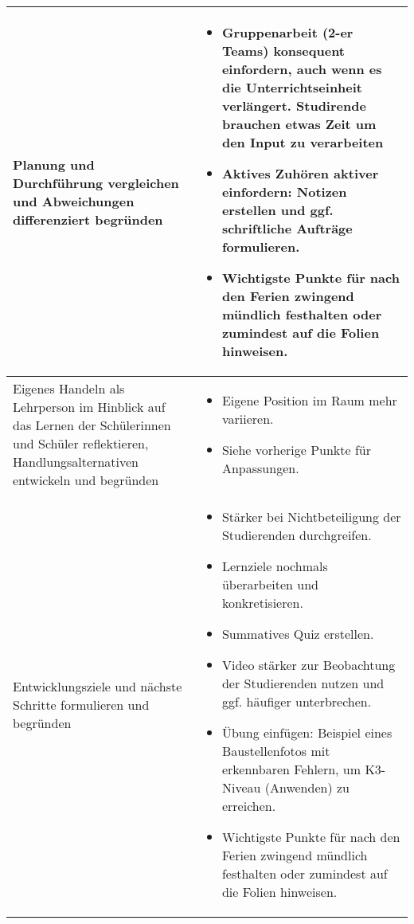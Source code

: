 \documentclass[
11pt,
captions=tableheading,
headsepline,
footsepline, 
captions=tableheading,
parskip=half-,
]{scrartcl}
\begin{document}
\begin{landscape}
\begin{longtable}{@{}p{8cm}|p{15cm}@{}}
        Planung und Durchführung vergleichen und Abweichungen differenziert begründen &
        \begin{itemize}
            \item Gruppenarbeit (2-er Teams) konsequent einfordern, auch wenn es die Unterrichtseinheit verlängert. Studirende brauchen etwas Zeit um den Input zu verarbeiten
            \item Aktives Zuhören aktiver einfordern: Notizen erstellen und ggf. schriftliche Aufträge formulieren.
            \item  Wichtigste Punkte für nach den Ferien zwingend mündlich festhalten oder zumindest auf die Folien hinweisen.
        \end{itemize} \\
        \midrule
    
        Eigenes Handeln als Lehrperson im Hinblick auf das Lernen der Schülerinnen und Schüler reflektieren, Handlungsalternativen entwickeln und begründen &
        \begin{itemize}
            \item Eigene Position im Raum mehr variieren.
            \item Siehe vorherige Punkte für Anpassungen.
        \end{itemize} \\
        \midrule
    
        Entwicklungsziele und nächste Schritte formulieren und begründen &
        \begin{itemize}
            \item Stärker bei Nichtbeteiligung der Studierenden durchgreifen.
            \item Lernziele nochmals überarbeiten und konkretisieren.
            \item Summatives Quiz erstellen.
            \item Video stärker zur Beobachtung der Studierenden nutzen und ggf. häufiger unterbrechen.
            \item Übung einfügen: Beispiel eines Baustellenfotos mit erkennbaren Fehlern, um K3-Niveau (Anwenden) zu erreichen.
            \item Wichtigste Punkte für nach den Ferien zwingend mündlich festhalten oder zumindest auf die Folien hinweisen.
        \end{itemize} \\
    \end{longtable}
    \end{landscape}
    
\end{document}
